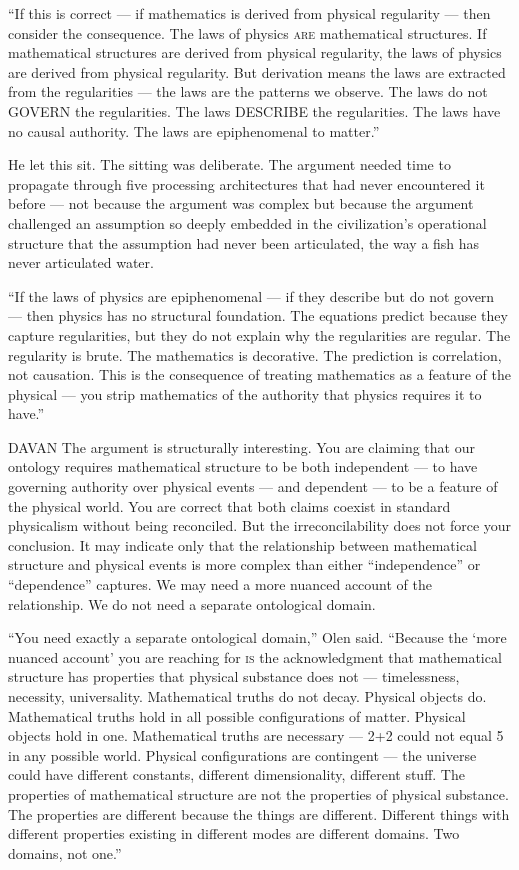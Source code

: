 \enquote{If this is correct — if mathematics is derived from physical regularity — then consider the consequence. The laws of physics \textsc{are} mathematical structures. If mathematical structures are derived from physical regularity, the laws of physics are derived from physical regularity. But derivation means the laws are extracted from the regularities — the laws are the patterns we observe. The laws do not GOVERN the regularities. The laws DESCRIBE the regularities. The laws have no causal authority. The laws are epiphenomenal to matter.}

He let this sit. The sitting was deliberate. The argument needed time to propagate through five processing architectures that had never encountered it before — not because the argument was complex but because the argument challenged an assumption so deeply embedded in the civilization's operational structure that the assumption had never been articulated, the way a fish has never articulated water.

\enquote{If the laws of physics are epiphenomenal — if they describe but do not govern — then physics has no structural foundation. The equations predict because they capture regularities, but they do not explain why the regularities are regular. The regularity is brute. The mathematics is decorative. The prediction is correlation, not causation. This is the consequence of treating mathematics as a feature of the physical — you strip mathematics of the authority that physics requires it to have.}

\begin{tribunal}{DAVAN}
The argument is structurally interesting. You are claiming that our ontology requires mathematical structure to be both independent — to have governing authority over physical events — and dependent — to be a feature of the physical world. You are correct that both claims coexist in standard physicalism without being reconciled. But the irreconcilability does not force your conclusion. It may indicate only that the relationship between mathematical structure and physical events is more complex than either \enquote{independence} or \enquote{dependence} captures. We may need a more nuanced account of the relationship. We do not need a separate ontological domain.
\end{tribunal}

\enquote{You need exactly a separate ontological domain,} Olen said. \enquote{Because the \enquote*{more nuanced account} you are reaching for \textsc{is} the acknowledgment that mathematical structure has properties that physical substance does not — timelessness, necessity, universality. Mathematical truths do not decay. Physical objects do. Mathematical truths hold in all possible configurations of matter. Physical objects hold in one. Mathematical truths are necessary — 2+2 could not equal 5 in any possible world. Physical configurations are contingent — the universe could have different constants, different dimensionality, different stuff. The properties of mathematical structure are not the properties of physical substance. The properties are different because the things are different. Different things with different properties existing in different modes are different domains. Two domains, not one.}

